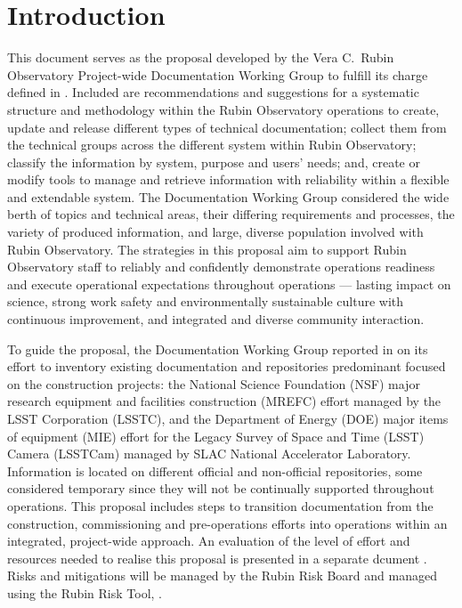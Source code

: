 \section{Introduction}

This document serves as the proposal developed by the Vera C.\ Rubin Observatory Project-wide Documentation Working Group to fulfill its charge defined in .
Included are recommendations and suggestions for a systematic structure and methodology within the Rubin Observatory operations to create, update and release different types of technical documentation; collect them from the technical groups across the different system within Rubin Observatory; classify the information by system, purpose and users' needs; and, create or modify tools to manage and retrieve information with reliability within a flexible and extendable system.
The Documentation Working Group considered the wide berth of topics and technical areas, their differing requirements and processes, the variety of produced information, and large, diverse population involved with Rubin Observatory.
The strategies in this proposal aim to support Rubin Observatory staff to reliably and confidently demonstrate operations readiness  and execute operational expectations throughout operations --- lasting impact on science, strong work safety and environmentally sustainable culture with continuous improvement, and integrated and diverse community interaction.

To guide the proposal, the Documentation Working Group reported in  on its effort to inventory existing documentation and repositories predominant focused on the construction projects: the National Science Foundation (NSF) major research equipment and facilities construction (MREFC) effort managed by the LSST Corporation (LSSTC), and the Department of Energy (DOE) major items of equipment (MIE) effort for the Legacy Survey of Space and Time (LSST) Camera (LSSTCam) managed by SLAC National Accelerator Laboratory.
Information is located on different official and non-official repositories, some considered temporary since they will not be continually supported throughout operations.
This proposal includes steps to transition documentation from the construction, commissioning and pre-operations efforts into operations within an integrated, project-wide approach.
An evaluation of the level of effort and resources needed to realise this proposal is presented in a separate dcument . 
Risks and mitigations will be managed by the Rubin Risk Board and managed using the Rubin Risk Tool, .

